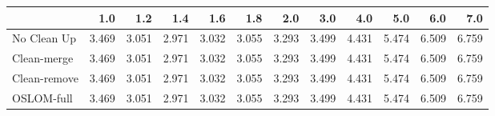 \begin{tabular}{lrrrrrrrrrrr}
\toprule
{} &   1.0 &   1.2 &   1.4 &   1.6 &   1.8 &   2.0 &   3.0 &   4.0 &   5.0 &   6.0 &   7.0 \\
\midrule
No Clean Up  & 3.469 & 3.051 & 2.971 & 3.032 & 3.055 & 3.293 & 3.499 & 4.431 & 5.474 & 6.509 & 6.759 \\
Clean-merge  & 3.469 & 3.051 & 2.971 & 3.032 & 3.055 & 3.293 & 3.499 & 4.431 & 5.474 & 6.509 & 6.759 \\
Clean-remove & 3.469 & 3.051 & 2.971 & 3.032 & 3.055 & 3.293 & 3.499 & 4.431 & 5.474 & 6.509 & 6.759 \\
OSLOM-full   & 3.469 & 3.051 & 2.971 & 3.032 & 3.055 & 3.293 & 3.499 & 4.431 & 5.474 & 6.509 & 6.759 \\
\bottomrule
\end{tabular}

